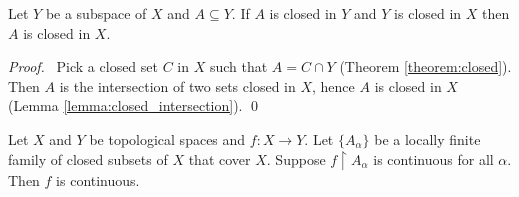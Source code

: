 \begin{theorem}
    \label{theorem:closed_subspace}
    Let $Y$ be a subspace of $X$ and $A \subseteq Y$. If $A$ is closed in $Y$ and $Y$ is closed in $X$
    then $A$ is closed in $X$.
\end{theorem}

\begin{proof}
    \pf\ Pick a closed set $C$ in $X$ such that $A = C \cap Y$ (Theorem \ref{theorem:closed}). Then
    $A$ is the intersection of two sets closed in $X$, hence $A$ is closed in $X$ (Lemma \ref{lemma:closed_intersection}). \qed
\end{proof}

\begin{theorem}
    Let $X$ and $Y$ be topological spaces and $f : X \rightarrow Y$. Let $\{ A_\alpha \}$ be a locally finite family of closed subsets of $X$ that cover $X$. Suppose $f \restriction A_\alpha$
    is continuous for all $\alpha$. Then $f$ is continuous.
\end{theorem}

